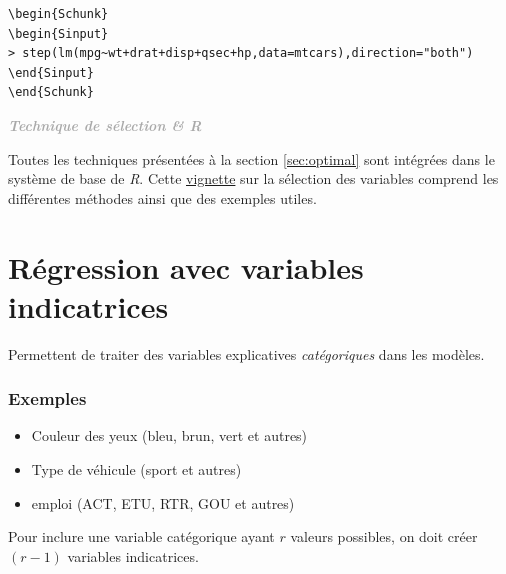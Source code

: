 \documentclass[11pt,french]{report}
\newenvironment{moreInfo}[1]
	{\begin{mdframed}
	\textcolor{darkgray}{\huge \raisebox{-3.5pt}{\faInfo} 
	\hspace{0.5cm} \large\bfseries #1}\\[5pt]
	\normalsize
	\makebox[0.1\textwidth][l]{}	
	\begin{minipage}{10cm}}
	{	\end{minipage}
	\end{mdframed}}
\begin{document}
\begin{lstlisting}[linerange=\\begin\{Sinput\}-\\end\{Sinput\},includerangemarker=false, caption = Code source en R pour l'exemple]
\begin{Schunk}
\begin{Sinput}
> step(lm(mpg~wt+drat+disp+qsec+hp,data=mtcars),direction="both")
\end{Sinput}
\end{Schunk}
\end{lstlisting}

\begin{moreInfo}{\emph{Technique de sélection \& \emph{R}}}
	Toutes les techniques présentées à la section \ref{sec:optimal} sont intégrées dans le système de base de \emph{R}. Cette \href{https://cran.r-project.org/web/packages/olsrr/vignettes/variable_selection.html}{vignette} sur la sélection des variables comprend les différentes méthodes ainsi que des exemples utiles.
\end{moreInfo}

\section{Régression avec variables indicatrices}
Permettent de traiter des variables explicatives \emph{catégoriques} dans les modèles.
\subsubsection*{Exemples}
\begin{itemize}
\item Couleur des yeux (bleu, brun, vert et autres)
\item Type de véhicule (sport et autres)
\item emploi (ACT, ETU, RTR, GOU et autres)
\end{itemize}
\bigskip

Pour inclure une variable catégorique ayant $r$ valeurs possibles, on doit créer $(r-1)$ variables indicatrices.
\end{document}
